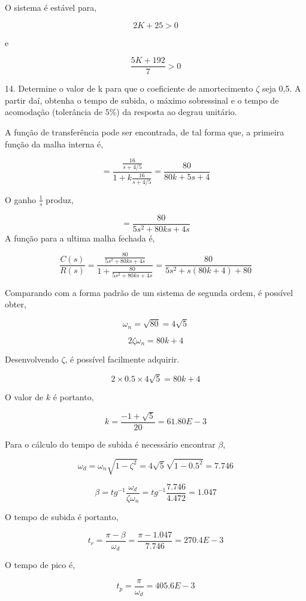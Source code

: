 \documentclass[paper=a4, fontsize=11pt]{article}
\begin{document}
O sistema é estável para,

$$
2 K + 25 > 0
$$

e 

$$
\frac{5K+192}{7} > 0
$$

\newpage

14. Determine o valor de k para que o coeficiente de amortecimento $\zeta $ seja 0,5. 
A partir daí, obtenha o tempo de subida, o máximo sobressinal e o tempo de acomodação 
(tolerância de $5\%$) da resposta ao degrau unitário.

A função de transferência pode ser encontrada, de tal forma que, a primeira
função da malha interna é,

$$
= \frac{\frac{16}{s+4/5}}{1 + k \frac{16}{s+4/5}} = \frac{80}{80 k + 5 s + 4}
$$

O ganho $\frac{1}{s}$ produz,

$$
= \frac{80}{5 s^2 + 80 k s + 4 s}
$$
A função para a ultima malha fechada é,

$$
\frac{C(s)}{R(s)} = \frac{\frac{80}{5 s^2 + 80 k s + 4 s}}{1 + \frac{80}{5 s^2 + 80 k s + 4 s}} = \frac{80}{5 s^2 + s(80 k + 4) + 80}
$$

Comparando com a forma padrão de um sistema de segunda ordem, é possível obter,

$$
\omega_n = \sqrt{80} = 4 \sqrt{5}
$$

$$
2 \zeta \omega_n = 80 k + 4
$$

Desenvolvendo $\zeta$, é possível facilmente adquirir.

$$
2 \times 0.5 \times 4 \sqrt{5} = 80 k + 4
$$

O valor de $k$ é portanto,

$$
k = \frac{-1 + \sqrt{5}}{20} = 61.80E-3
$$

Para o cálculo do tempo de subida é necessário encontrar $\beta$,

$$
\omega_d = \omega_n \sqrt{1 - \zeta^2} = 4 \sqrt{5} \sqrt{1 - 0.5^2} = 7.746
$$

$$
\beta = tg^{-1}\frac{\omega_d}{\zeta \omega_n} = tg^{-1}\frac{7.746}{4.472} = 1.047
$$

O tempo de subida é portanto,

$$
t_r = \frac{\pi - \beta}{\omega_d} = \frac{\pi - 1.047}{7.746} = 270.4E-3
$$

O tempo de pico é,

$$
t_p = \frac{\pi}{\omega_d} = 405.6E-3
$$
\end{document}
